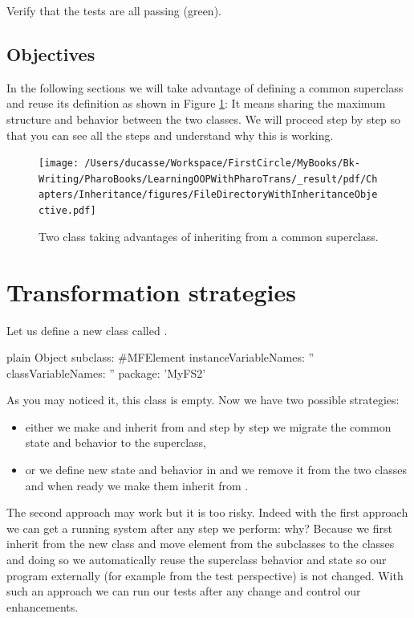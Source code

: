 \documentclass[10pt,twoside,english]{_support/latex/sbabook/sbabook}
\begin{document}
Verify that the tests are all passing (green).
\subsection{Objectives}
In the following sections we will take advantage of defining a common superclass and reuse its definition as shown in Figure \ref{FileDirectoryWithInheritanceObjective}: It means sharing the maximum structure and behavior between the two classes. We will proceed step by step so that you can see all the steps and understand why this is working.


\begin{figure}

\begin{center}
\texttt{[image: /Users/ducasse/Workspace/FirstCircle/MyBooks/Bk-Writing/PharoBooks/LearningOOPWithPharoTrans/\_result/pdf/Chapters/Inheritance/figures/FileDirectoryWithInheritanceObjective.pdf]}\caption{Two class taking advantages of inheriting from a common superclass.\label{FileDirectoryWithInheritanceObjective}}\end{center}
\end{figure}

\section{Transformation strategies}
Let us define a new class called . 

\begin{displaycode}{plain}
Object subclass: #MFElement
	instanceVariableNames: ''
	classVariableNames: ''
	package: 'MyFS2'
\end{displaycode}

As you may noticed it, this class is empty. Now we have two possible strategies: 

\begin{itemize}
\item either we make  and  inherit from  and  step by step we migrate the common state and behavior to the superclass,
\item or we define new state and behavior in  and we remove it  from the two classes and when ready we make them inherit from . 
\end{itemize}

The second approach may work but it is too risky. Indeed with the first approach we can get a running system after any step we perform: why? Because we first inherit from the new class and move element from the subclasses to the classes and doing so we automatically reuse the superclass behavior and state so our program externally (for example from the test perspective) is not changed. With such an approach we can run our tests after any change and control our enhancements.
\end{document}
